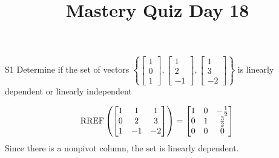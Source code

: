 \documentclass{sbgLAquiz}
\title{Mastery Quiz Day 18 }
\begin{document}
\begin{problem}{S1}
Determine if the set of vectors  $\left\{\begin{bmatrix} 1 \\ 0 \\ 1 \end{bmatrix}, \begin{bmatrix} 1 \\ 2 \\ -1 \end{bmatrix}, \begin{bmatrix} 1 \\ 3 \\ -2 \end{bmatrix}\right\}$ is  linearly dependent or linearly independent
\end{problem}
\begin{solution}
$$\operatorname{RREF}\left( \begin{bmatrix} 1 &  1 & 1 \\ 0  & 2 & 3 \\ 1  & -1 & -2 \end{bmatrix} \right) = \begin{bmatrix} 1 &  0 & -\frac{1}{2} \\ 0  & 1 & \frac{3}{2} \\ 0& 0 & 0  \end{bmatrix}$$
Since there is a nonpivot column, the set is linearly dependent.
\end{solution}
\end{document}
